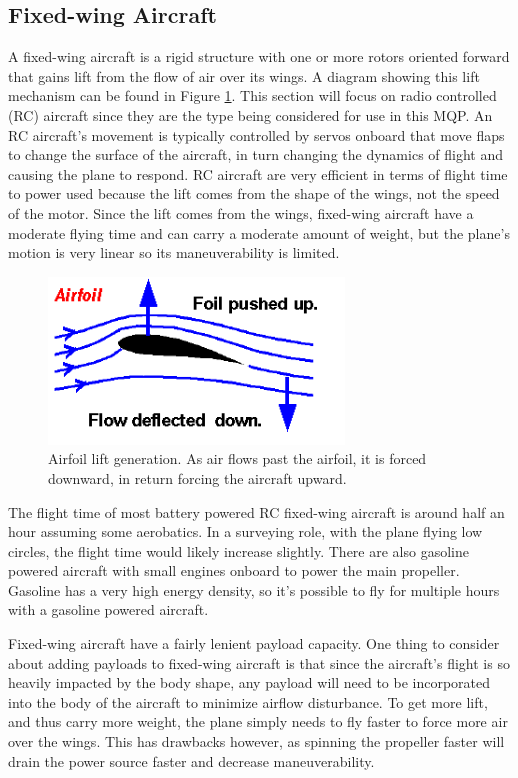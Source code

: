 \subsection{Fixed-wing Aircraft}
A fixed-wing aircraft is a rigid structure with one or more rotors oriented forward that gains lift from the flow of air over its wings\cite{airplane_book}. A diagram showing this lift mechanism can be found in Figure \ref{fig:airfoil_lift}. This section will focus on radio controlled (RC) aircraft since they are the type being considered for use in this MQP. An RC aircraft’s movement is typically controlled by servos onboard that move flaps to change the surface of the aircraft, in turn changing the dynamics of flight and causing the plane to respond. RC aircraft are very efficient in terms of flight time to power used because the lift comes from the shape of the wings, not the speed of the motor\cite{airplane_site}. Since the lift comes from the wings, fixed-wing aircraft have a moderate flying time and can carry a moderate amount of weight, but the plane’s motion is very linear so its maneuverability is limited.\par
\begin{figure}[ht]
\centering
\includegraphics[width=0.70\textwidth]{img/airfoil_lift.png}
\caption{Airfoil lift generation. As air flows past the airfoil, it is forced downward, in return forcing the aircraft upward.}
\label{fig:airfoil_lift}
\end{figure}\par
The flight time of most battery powered RC fixed-wing aircraft is around half an hour assuming some aerobatics\cite{airplane_book}. In a surveying role, with the plane flying low circles, the flight time would likely increase slightly. There are also gasoline powered aircraft with small engines onboard to power the main propeller. Gasoline has a very high energy density, so it’s possible to fly for multiple hours with a gasoline powered aircraft.\par
Fixed-wing aircraft have a fairly lenient payload capacity. One thing to consider about adding payloads to fixed-wing aircraft is that since the aircraft’s flight is so heavily impacted by the body shape, any payload will need to be incorporated into the body of the aircraft to minimize airflow disturbance. To get more lift, and thus carry more weight, the plane simply needs to fly faster to force more air over the wings. This has drawbacks however, as spinning the propeller faster will drain the power source faster and decrease maneuverability.\par
